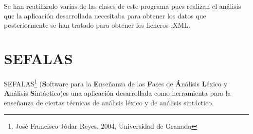 Se han reutilizado varias de las clases de este programa pues realizan el análisis que la aplicación desarrollada necesitaba para obtener los datos que posteriormente se han tratado para obtener los ficheros .XML.


\section{SEFALAS}

SEFALAS\footnote{José Francisco Jódar Reyes, 2004, Universidad de Granada} (\textbf{S}oftware para la \textbf{E}nseñanza de las \textbf{F}ases de \textbf{Á}nálisis \textbf{L}éxico y \textbf{A}nálisis \textbf{S}intáctico)es una aplicación desarrollada como herramienta para la enseñanza de ciertas técnicas de análisis léxico y de análisis sintáctico. 



